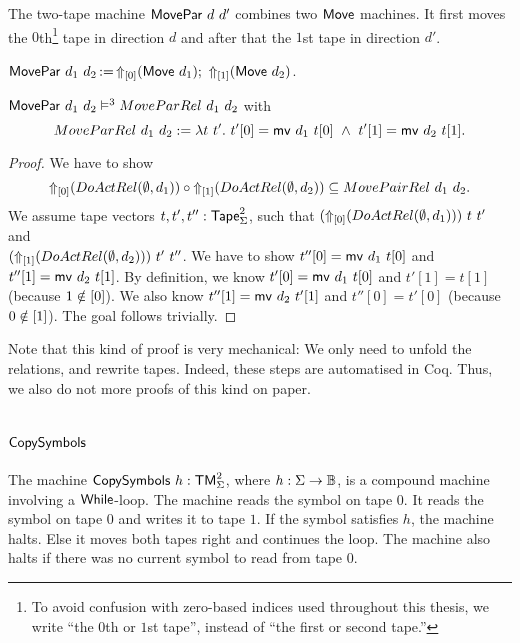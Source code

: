 The two-tape machine $\MS{MovePar}~d~d'$ combines two $\MS{Move}$ machines.  It first moves the $0$th\footnote{To avoid confusion with zero-based
  indices used throughout this thesis, we write ``the $0$th or $1$st tape'', instead of ``the first or second tape.''} tape in direction $d$ and after
that the $1$st tape in direction $d'$.
\begin{definition}[$\MS{MovePar}$]
  \label{def:MovePar}
  $\MS{MovePar}~d_1~d_2 \defop \LiftTapes{(\MS{Move}~d_1)}{\Vector{0}} \Seq \LiftTapes{(\MS{Move}~d_2)}{\Vector{1}}$.
\end{definition}
\begin{lemma}
  \label{lem:MovePar_Sem}
  $\MS{MovePar}~d_1~d_2 \RealiseIn3 MoveParRel~d_1~d_2$ with
  \[ MoveParRel~d_1~d_2 := \lambda t~t'.~t'[0]=\MS{mv}~d_1~t[0] ~\land~ t'[1]=\MS{mv}~d_2~t[1]. \]
\end{lemma}
\begin{proof}
  We have to show
  $$
    \LiftTapes{(DoActRel(\None,d_1))}{\Vector{0}} \circ
    \LiftTapes{(DoActRel(\None,d_2))}{\Vector{1}} \subseteq
    MovePairRel~d_1~d_2.
  $$
  We assume tape vectors $t, t', t'' : \Tape_\Sigma^2$, such that $(\LiftTapes{(DoActRel(\None,d_1))}{\Vector{0}})~t~t'$ and \\
  $(\LiftTapes{(DoActRel(\None,d_2))}{\Vector{1}})~t'~t''$.  We have to show $t''[0]=\MS{mv}~d_1~t[0]$ and $t''[1]=\MS{mv}~d_2~t[1]$.  By definition,
  we know $t'[0]=\MS{mv}~d_1~t[0]$ and $t'[1]=t[1]$ (because $1 \notin \Vector{0}$).  We also know $t''[1]=\MS{mv}~d_2~t'[1]$ and $t''[0]=t'[0]$
  (because $0 \notin \Vector{1}$).  The goal follows trivially.
\end{proof}
Note that this kind of proof is very mechanical: We only need to unfold the relations, and rewrite tapes.  Indeed, these steps are automatised in Coq.
Thus, we also do not more proofs of this kind on paper.

\section{$\MS{CopySymbols}$}
\label{sec:CopySymbols}

The machine $\MS{CopySymbols}~h : \TM_\Sigma^2$, where $h:\Sigma\to\Bool$, is a compound machine involving a $\While$-loop.  The machine reads the
symbol on tape $0$.  It reads the symbol on tape $0$ and writes it to tape $1$.  If the symbol satisfies $h$, the machine halts.  Else it moves both
tapes right and continues the loop.  The machine also halts if there was no current symbol to read from tape $0$.

